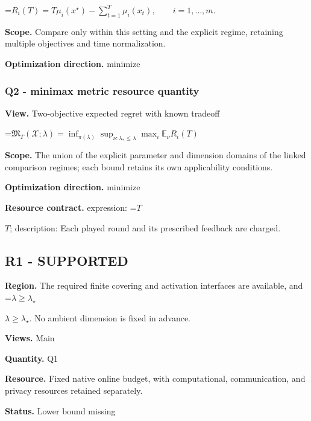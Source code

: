 \documentclass[10pt,a4paper]{article}
\newcommand{\AtlasMath}[1]{\par\begingroup\centering\setbox0=\hbox{$\displaystyle #1$}\ifdim\wd0>1.4\linewidth\typeout{ATLAS WIDE FORMULA: \the\wd0}\fi\ifdim\wd0>\linewidth\resizebox{\linewidth}{!}{\box0}\else\box0\fi\par\endgroup}
\newcommand{\AtlasInlineMath}[1]{\begingroup\setbox0=\hbox{$#1$}\ifdim\wd0>.4\linewidth\endgroup\AtlasMath{#1}\else\endgroup$#1$\fi}
\begin{document}
\AtlasMath{R_i(T)=T\mu_i(x^\star)-\sum_{t=1}^{T}\mu_i(x_t),\qquad i=1,\ldots,m.}


\textbf{Scope.} Compare only within this setting and the explicit regime, retaining multiple objectives and time normalization.



\textbf{Optimization direction.} minimize



\subsubsection{Q2 - minimax metric resource quantity}


\textbf{View.} Two-objective expected regret with known tradeoff



\AtlasMath{\mathfrak M_T(\mathcal X;\lambda)=\inf_{\pi(\lambda)}\sup_{\nu:\lambda_*\le\lambda}\max_i\mathbb E_\nu R_i(T)}


\textbf{Scope.} The union of the explicit parameter and dimension domains of the linked comparison regimes; each bound retains its own applicability conditions.



\textbf{Optimization direction.} minimize



\textbf{Resource contract.} expression: \AtlasInlineMath{T}; description: Each played round and its prescribed feedback are charged.



\subsection{R1 - SUPPORTED}


\textbf{Region.} The required finite covering and activation interfaces are available, and \AtlasInlineMath{\lambda\ge\lambda_\star}. No ambient dimension is fixed in advance.



\textbf{Views.} Main



\textbf{Quantity.} Q1



\textbf{Resource.} Fixed native online budget, with computational, communication, and privacy resources retained separately.



\textbf{Status.} Lower bound missing
\end{document}
